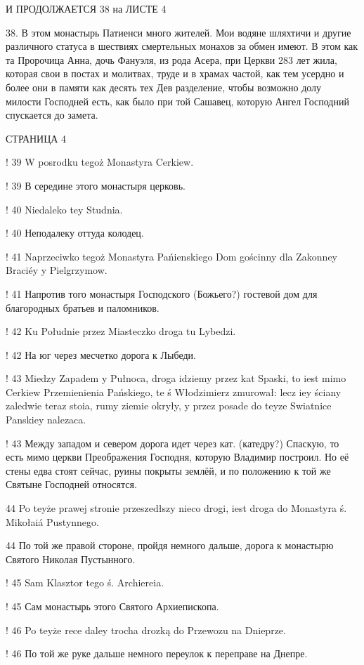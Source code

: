 И ПРОДОЛЖАЕТСЯ 38 на ЛИСТЕ 4

38. В этом монастырь Патиенси много жителей. Мои водяне шляхтичи и другие различного статуса в шествиях смертельных монахов за обмен имеют. В этом как та Пророчица Анна, дочь Фануэля, из рода Асера, при Церкви 283 лет жила, которая свои в постах и молитвах, труде и в храмах частой, как тем усердно и более они в памяти как десять тех Дев разделение, чтобы возможно долу милости Господней есть, как было при той Сашавец, которую Ангел Господний спускается до замета.




СТРАНИЦА 4

! 39 W posrodku tegoż Monastyra Cerkiew.

! 39 В середине этого монастыря церковь.


! 40 Niedaleko tey Studnia.

! 40 Неподалеку оттуда колодец.

! 41 Naprzeciwko tegoż Monastyra Pańienskiego Dom gościnny dla Zakonney Braciéy y Pielgrzymow.

! 41 Напротив того монастыря Господского (Божьего?) гостевой дом для благородных братьев и паломников.


! 42 Ku Południe przez Miasteczko droga tu Lybedzi.

! 42 На юг через месчетко дорога к Лыбеди.

! 43 Miedzy Zapadem y Pułnoca, droga idziemy przez kat Spaski, to iest mimo Cerkiew Przemienienia Pańskiego, te ś Włodzimierz zmurował: lecz iey ściany zaledwie teraz stoia, rumy ziemie okryły, y przez posade do teyze Swiatnice Panskiey nalezaca.

! 43 Между западом и севером дорога идет через кат. (катедру?) Спаскую, то есть мимо церкви Преображения Господня, которую Владимир построил. Но её стены едва стоят сейчас, руины покрыты землёй, и по положению к той же Святыне Господней относятся.


44 Po teyże prawej stronie przeszedłszy nieco drogi, iest droga do Monastyra ś. Mikołaiá Pustynnego.

44 По той же правой стороне, пройдя немного дальше, дорога к монастырю Святого Николая Пустынного. 

! 45 Sam Klasztor tego ś. Archiereia.

! 45 Сам монастырь этого Святого Архиепископа.


! 46 Po teyże rece daley trocha drozką do Przewozu na Dnieprze.

! 46 По той же руке дальше немного переулок к переправе на Днепре.

